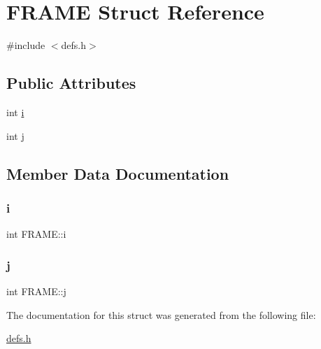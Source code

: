 \hypertarget{structFRAME}{}\section{F\+R\+A\+ME Struct Reference}
\label{structFRAME}


{\ttfamily \#include $<$defs.\+h$>$}

\subsection*{Public Attributes}
\begin{DoxyCompactItemize}
\item 
int \hyperlink{structFRAME_af3ff197cc71e2f1bda04a235cdbff246}{i}
\item 
int \hyperlink{structFRAME_a7aeed9ddb6d33a04d1d11bd59af7ed94}{j}
\end{DoxyCompactItemize}


\subsection{Member Data Documentation}
\mbox{\label{structFRAME_af3ff197cc71e2f1bda04a235cdbff246}} 
\subsubsection{\texorpdfstring{i}{i}}
{\footnotesize\ttfamily int F\+R\+A\+M\+E\+::i}

\mbox{\label{structFRAME_a7aeed9ddb6d33a04d1d11bd59af7ed94}} 
\subsubsection{\texorpdfstring{j}{j}}
{\footnotesize\ttfamily int F\+R\+A\+M\+E\+::j}



The documentation for this struct was generated from the following file\+:\begin{DoxyCompactItemize}
\item 
\hyperlink{defs_8h}{defs.\+h}\end{DoxyCompactItemize}
